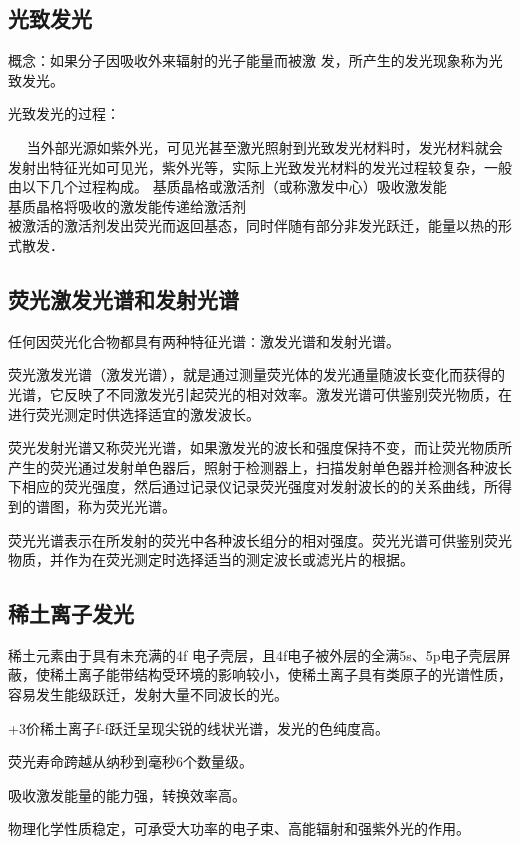 \documentclass{article}
\begin{document}
\subsection{光致发光}
概念：如果分子因吸收外来辐射的光子能量而被激    		发，所产生的发光现象称为光致发光。


光致发光的过程：


　  当外部光源如紫外光，可见光甚至激光照射到光致发光材料时，发光材料就会发射出特征光如可见光，紫外光等，实际上光致发光材料的发光过程较复杂，一般由以下几个过程构成。
基质晶格或激活剂（或称激发中心）吸收激发能\\
基质晶格将吸收的激发能传递给激活剂\\
被激活的激活剂发出荧光而返回基态，同时伴随有部分非发光跃迁，能量以热的形式散发．
	\subsection{荧光激发光谱和发射光谱}
	任何因荧光化合物都具有两种特征光谱∶激发光谱和发射光谱。


           荧光激发光谱（激发光谱），就是通过测量荧光体的发光通量随波长变化而获得的光谱，它反映了不同激发光引起荧光的相对效率。激发光谱可供鉴别荧光物质，在进行荧光测定时供选择适宜的激发波长。
           
           
           荧光发射光谱又称荧光光谱，如果激发光的波长和强度保持不变，而让荧光物质所产生的荧光通过发射单色器后，照射于检测器上，扫描发射单色器并检测各种波长下相应的荧光强度，然后通过记录仪记录荧光强度对发射波长的的关系曲线，所得到的谱图，称为荧光光谱。
           
           
       荧光光谱表示在所发射的荧光中各种波长组分的相对强度。荧光光谱可供鉴别荧光物质，并作为在荧光测定时选择适当的测定波长或滤光片的根据。
       
       \subsection{稀土离子发光}
       稀土元素由于具有未充满的4f 电子壳层，且4f电子被外层的全满5s、5p电子壳层屏蔽，使稀土离子能带结构受环境的影响较小，使稀土离子具有类原子的光谱性质，容易发生能级跃迁，发射大量不同波长的光。
       
     
+3价稀土离子f-f跃迁呈现尖锐的线状光谱，发光的色纯度高。


荧光寿命跨越从纳秒到毫秒6个数量级。


吸收激发能量的能力强，转换效率高。


物理化学性质稳定，可承受大功率的电子束、高能辐射和强紫外光的作用。
\end{document}
